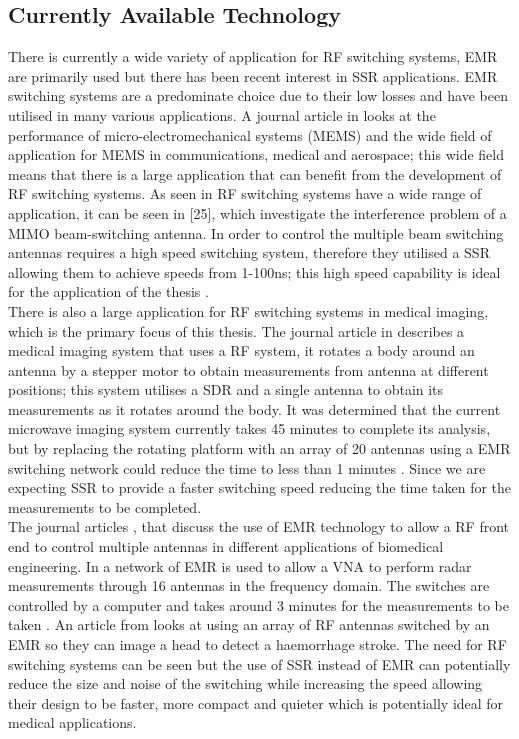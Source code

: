 \documentclass[12pt,openany,a4paper]{book}
\begin{document}
\subsection{Currently Available Technology}
There is currently a wide variety of application for RF switching systems, EMR are primarily used but there has been recent interest in SSR applications. EMR switching systems are a predominate choice due to their low losses and have been utilised in many various applications. A journal article in \cite{ref24} looks at the performance of micro-electromechanical systems (MEMS) and the wide field of application for MEMS in communications, medical and aerospace; this wide field means that there is a large application that can benefit from the development of RF switching systems. As seen in \cite{ref24} RF switching systems have a wide range of application, it can be seen in [25], which investigate the interference problem of a MIMO beam-switching antenna. In order to control the multiple beam switching antennas requires a high speed switching system, therefore they utilised a SSR allowing them to achieve speeds from 1-100ns; this high speed capability is ideal for the application of the thesis \cite{ref25}.\\[0.2cm]
There is also a large application for RF switching systems in medical imaging, which is the primary focus of this thesis. The journal article in \cite{ref3} describes a medical imaging system that uses a RF system, it rotates a body around an antenna by a stepper motor to obtain measurements from antenna at different positions; this system utilises a SDR and a single antenna to obtain its measurements as it rotates around the body. It was determined that the current microwave imaging system currently takes 45 minutes to complete its analysis, but by replacing the rotating platform with an array of 20 antennas using a EMR switching network could reduce the time to less than 1 minutes \cite{ref3}. Since we are expecting SSR to provide a faster switching speed reducing the time taken for the measurements to be completed.\\[0.2cm]
The journal articles \cite{ref26}, \cite{ref27} that discuss the use of EMR technology to allow a RF front end to control multiple antennas in different applications of biomedical engineering. In \cite{ref26} a network of EMR is used to allow a VNA to perform radar measurements through 16 antennas in the frequency domain. The switches are controlled by a computer and takes around 3 minutes for the measurements to be taken \cite{ref26}. An article from \cite{ref27} looks at using an array of RF antennas switched by an EMR so they can image a head to detect a haemorrhage stroke. \cite{ref27} The need for RF switching systems can be seen but the use of SSR instead of EMR can potentially reduce the size and noise of the switching while increasing the speed allowing their design to be faster, more compact and quieter which is potentially ideal for medical applications. 
\end{document}

